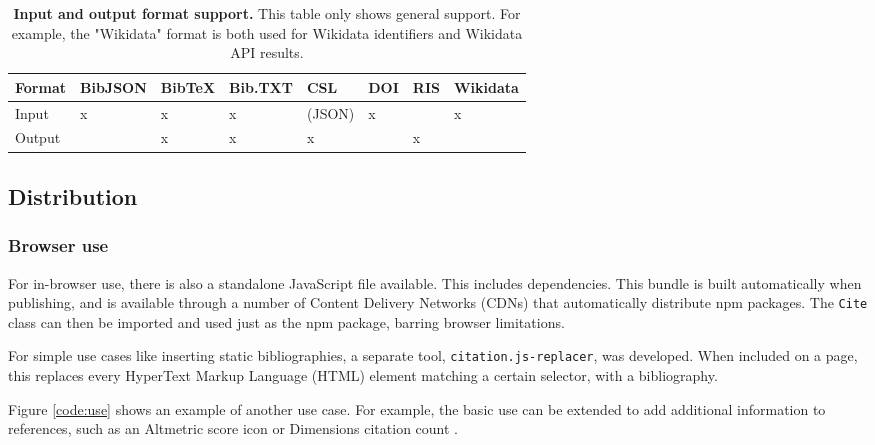 \documentclass[fleqn,10pt,lineno]{wlpeerj} %
\begin{document}
\begin{table}[bt!]
\caption{\textbf{Input and output format support.}
This table only shows general support. For example, the "Wikidata" format is both used for Wikidata identifiers and Wikidata API results.}
\label{table:support}
\begin{tabular}{|l|l|l|l|l|l|l|l|}
\hline
\textbf{Format} & \textbf{BibJSON} & \textbf{BibTeX} & \textbf{Bib.TXT} & \textbf{CSL} & \textbf{DOI} & \textbf{RIS} & \textbf{Wikidata} \\ \hline
Input           & x                & x               & x                & (JSON)       & x            &              & x                 \\ \hline
Output          & \textbf{}        & x               & x                & x            &              & x            &                   \\ \hline
\end{tabular}
\end{table}

\subsection*{Distribution}

\subsubsection*{Browser use}

For in-browser use, there is also a standalone JavaScript file available. This includes dependencies. This bundle is built automatically when publishing, and is available through a number of Content Delivery Networks (CDNs) that automatically distribute npm packages. The \texttt{Cite} class can then be imported and used just as the npm package, barring browser limitations.

For simple use cases like inserting static bibliographies, a separate tool, \texttt{citation.js-replacer}, was developed. When included on a page, this replaces every HyperText Markup Language (HTML) element matching a certain selector, with a bibliography.

Figure \ref{code:use} shows an example of another use case. For example, the basic use can be extended to add additional information to references, such as an Altmetric \citep{adie_altmetric:_2013} score icon or Dimensions citation count \citep{thelwall_dimensions:_2018}.
\end{document}
